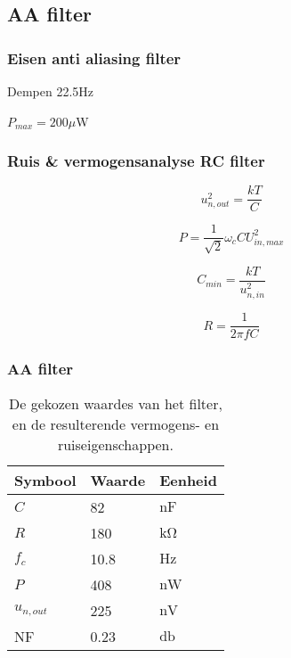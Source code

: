     \subsection*{AA filter}
    \begin{frame}
        \frametitle{Eisen anti aliasing filter}
    
        Dempen 22.5Hz


        $P_{max}=200\mu$W
    
    \end{frame}
    \begin{frame}
        \frametitle{Ruis \& vermogensanalyse RC filter}
    
        \begin{equation}\label{eq:dividerNoise}
            u_{n,out}^2 = \frac{kT}{C}
        \end{equation}

        \begin{equation} \label{eq:filterPower}
            P = \frac{1}{\sqrt{2}}\omega_cCU_{in,max}^2
        \end{equation}

        \pause

        \begin{equation} \label{eq:filterCapMin}
            C_{min} = \frac{kT}{u_{n,in}^2}
        \end{equation}

        \begin{equation}
            R = \frac{1}{2\pi fC}
        \end{equation}
    
    \end{frame}
    \begin{frame}
        \frametitle{AA filter}
    
        \begin{table}[ht]
            \centering
            \begin{tabular}{l|l|l}
                Symbool & Waarde & Eenheid \\
                \hline
                $C$         & 82    & $\si{\nano\farad}$\\
                $R$         & 180   & $\si{\kilo\ohm}$  \\
                $f_c$       & 10.8  & $\si{\hertz}$     \\
                $P$         & 408   & $\si{\nano\watt}$ \\
                $u_{n,out}$ & 225   & $\si{\nano\volt}$ \\
                NF          & 0.23  & $\si{\decibel}$   \\
            \end{tabular}
            \caption{De gekozen waardes van het filter, en de resulterende vermogens- en ruiseigenschappen.}
            \label{tab:filterValues}
        \end{table}
    
    \end{frame}
